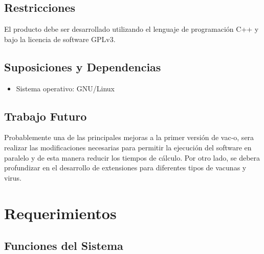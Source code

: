 \documentclass[10pt,a4paper]{article}
\begin{document}
  \subsection{Restricciones}
  El producto debe ser desarrollado utilizando el lenguaje de programaci\'on C++ y bajo la licencia de software GPLv3.
  
  \subsection{Suposiciones y Dependencias}
    \begin{itemize}
      \item Sistema operativo: GNU/Linux
    \end{itemize}
  
  \subsection{Trabajo Futuro}
  Probablemente una de las principales mejoras a la primer versi\'on de vac-o, sera realizar las modificaciones necesarias para permitir la ejecuci\'on del software en paralelo y de esta manera reducir los tiempos de c\'alculo. 
  Por otro lado, se debera profundizar en el desarrollo de extensiones para diferentes tipos de vacunas y virus.
  

\section{Requerimientos}
  \label{section-req}  
  \subsection{Funciones del Sistema}
\end{document}
